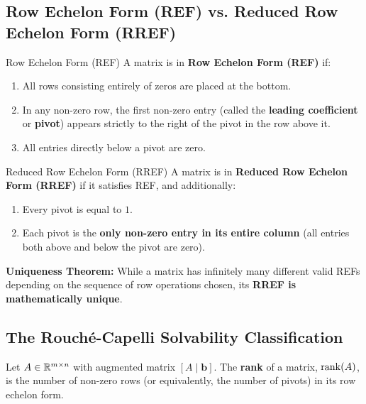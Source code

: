 \subsection{Row Echelon Form (REF) vs. Reduced Row Echelon Form (RREF)}

\begin{definitionbox}{Row Echelon Form (REF)}
A matrix is in \textbf{Row Echelon Form (REF)} if:
\begin{enumerate}
    \item All rows consisting entirely of zeros are placed at the bottom.
    \item In any non-zero row, the first non-zero entry (called the \textbf{leading coefficient} or \textbf{pivot}) appears strictly to the right of the pivot in the row above it.
    \item All entries directly below a pivot are zero.
\end{enumerate}
\end{definitionbox}

\begin{definitionbox}{Reduced Row Echelon Form (RREF)}
A matrix is in \textbf{Reduced Row Echelon Form (RREF)} if it satisfies REF, and additionally:
\begin{enumerate}
    \item Every pivot is equal to $1$.
    \item Each pivot is the \textbf{only non-zero entry in its entire column} (all entries both above and below the pivot are zero).
\end{enumerate}
\textbf{Uniqueness Theorem:} While a matrix has infinitely many different valid REFs depending on the sequence of row operations chosen, its \textbf{RREF is mathematically unique}.
\end{definitionbox}

\subsection{The Rouché-Capelli Solvability Classification}

Let $A \in \mathbb{R}^{m \times n}$ with augmented matrix $[A \mid \mathbf{b}]$. The \textbf{rank} of a matrix, $\operatorname{rank}(A)$, is the number of non-zero rows (or equivalently, the number of pivots) in its row echelon form.

